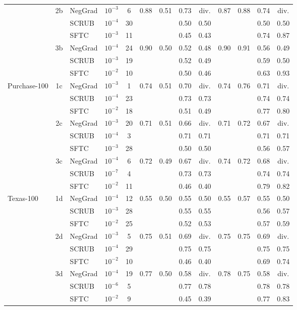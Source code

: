\begin{table}[t]
{\begin{tabular}{l c l c c cccccccc}
 & 2b & NegGrad & $10^{-3}$ & 6 & 0.88 & 0.51 & 0.73 & div. & 0.87 & 0.88 & 0.74 & div. \\
 &  & SCRUB & $10^{-4}$ & 30 &  &  & 0.50 & 0.50 &  &  & 0.50 & 0.50 \\
 &  & SFTC & $10^{-3}$ & 11 &  &  & 0.45 & 0.43 &  &  & 0.74 & 0.87 \\
\cmidrule(lr){2-13}
 & 3b & NegGrad & $10^{-4}$ & 24 & 0.90 & 0.50 & 0.52 & 0.48 & 0.90 & 0.91 & 0.56 & 0.49 \\
 &  & SCRUB & $10^{-3}$ & 19 &  &  & 0.52 & 0.49 &  &  & 0.59 & 0.50 \\
 &  & SFTC & $10^{-2}$ & 10 &  &  & 0.50 & 0.46 &  &  & 0.63 & 0.93 \\
\midrule
Purchase-100 & 1c & NegGrad & $10^{-3}$ & 1 & 0.74 & 0.51 & 0.70 & div. & 0.74 & 0.76 & 0.71 & div. \\
 &  & SCRUB & $10^{-4}$ & 23 &  &  & 0.73 & 0.73 &  &  & 0.74 & 0.74 \\
 &  & SFTC & $10^{-2}$ & 18 &  &  & 0.51 & 0.49 &  &  & 0.77 & 0.80 \\
\cmidrule(lr){2-13}
 & 2c & NegGrad & $10^{-3}$ & 20 & 0.71 & 0.51 & 0.66 & div. & 0.71 & 0.72 & 0.67 & div. \\
 &  & SCRUB & $10^{-4}$ & 3 &  &  & 0.71 & 0.71 &  &  & 0.71 & 0.71 \\
 &  & SFTC & $10^{-3}$ & 28 &  &  & 0.50 & 0.50 &  &  & 0.56 & 0.57 \\
\cmidrule(lr){2-13}
 & 3c & NegGrad & $10^{-4}$ & 6 & 0.72 & 0.49 & 0.67 & div. & 0.74 & 0.72 & 0.68 & div. \\
 &  & SCRUB & $10^{-7}$ & 4 &  &  & 0.73 & 0.73 &  &  & 0.74 & 0.74 \\
 &  & SFTC & $10^{-2}$ & 11 &  &  & 0.46 & 0.40 &  &  & 0.79 & 0.82 \\
\midrule
Texas-100 & 1d & NegGrad & $10^{-4}$ & 12 & 0.55 & 0.50 & 0.55 & 0.50 & 0.55 & 0.57 & 0.55 & 0.50 \\
 &  & SCRUB & $10^{-3}$ & 28 &  &  & 0.55 & 0.55 &  &  & 0.56 & 0.57 \\
 &  & SFTC & $10^{-2}$ & 25 &  &  & 0.52 & 0.53 &  &  & 0.57 & 0.59 \\
\cmidrule(lr){2-13}
 & 2d & NegGrad & $10^{-3}$ & 5 & 0.75 & 0.51 & 0.69 & div. & 0.75 & 0.75 & 0.69 & div. \\
 &  & SCRUB & $10^{-4}$ & 29 &  &  & 0.75 & 0.75 &  &  & 0.75 & 0.75 \\
 &  & SFTC & $10^{-2}$ & 10 &  &  & 0.46 & 0.40 &  &  & 0.69 & 0.74 \\
\cmidrule(lr){2-13}
 & 3d & NegGrad & $10^{-4}$ & 19 & 0.77 & 0.50 & 0.58 & div. & 0.78 & 0.75 & 0.58 & div. \\
 &  & SCRUB & $10^{-6}$ & 5 &  &  & 0.77 & 0.78 &  &  & 0.78 & 0.78 \\
 &  & SFTC & $10^{-2}$ & 9 &  &  & 0.45 & 0.39 &  &  & 0.77 & 0.83 \\
\bottomrule
\end{tabular}}
\end{table}
